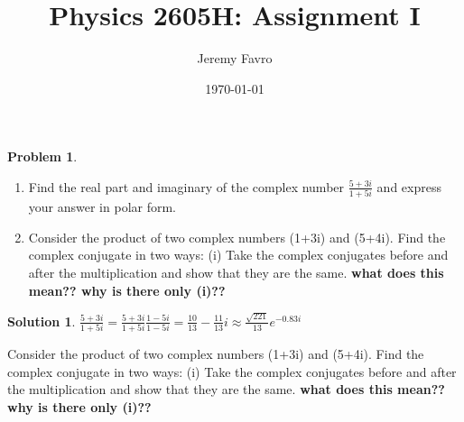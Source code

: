 \documentclass[10pt]{article}
\title{Physics 2605H: Assignment I}
\author{Jeremy Favro}
\date{\today}
\theoremstyle{definition}
\newtheorem{problem}{Problem}
\newtheorem{soln}{Solution}
\begin{document}
\maketitle

\begin{problem}~
\begin{enumerate}[label=(\alph*)]
  \item Find the real part and imaginary of the complex number $\frac{5+3i}{1+5i}$ and express your answer in polar form.
  \item Consider the product of two complex numbers (1+3i) and (5+4i). Find the complex conjugate in two ways:
        (i) Take the complex conjugates before and after the
        multiplication and show that they are the same. \textbf{what does this mean?? why is there only (i)??}
\end{enumerate}
\end{problem}
\begin{soln}
  \item $\frac{5+3i}{1+5i}=\frac{5+3i}{1+5i}\frac{1-5i}{1-5i}=\frac{10}{13}-\frac{11}{13}i\approx\frac{\sqrt{221}}{13}e^{-0.83i}$
  \item Consider the product of two complex numbers (1+3i) and (5+4i). Find the complex conjugate in two ways:
        (i) Take the complex conjugates before and after the
        multiplication and show that they are the same. \textbf{what does this mean?? why is there only (i)??}
\end{soln}
\end{document}
